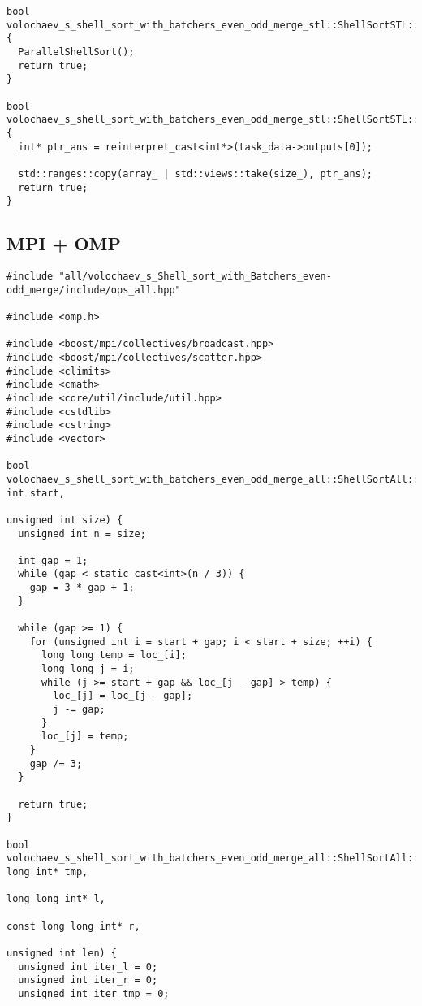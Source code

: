 \documentclass[12pt]{article}
\begin{document}
\begin{lstlisting}
bool volochaev_s_shell_sort_with_batchers_even_odd_merge_stl::ShellSortSTL::RunImpl() {
  ParallelShellSort();
  return true;
}

bool volochaev_s_shell_sort_with_batchers_even_odd_merge_stl::ShellSortSTL::PostProcessingImpl() {
  int* ptr_ans = reinterpret_cast<int*>(task_data->outputs[0]);

  std::ranges::copy(array_ | std::views::take(size_), ptr_ans);
  return true;
}
\end{lstlisting}

\subsection*{MPI + OMP}
\begin{lstlisting}
#include "all/volochaev_s_Shell_sort_with_Batchers_even-odd_merge/include/ops_all.hpp"

#include <omp.h>

#include <boost/mpi/collectives/broadcast.hpp>
#include <boost/mpi/collectives/scatter.hpp>
#include <climits>
#include <cmath>
#include <core/util/include/util.hpp>
#include <cstdlib>
#include <cstring>
#include <vector>

bool volochaev_s_shell_sort_with_batchers_even_odd_merge_all::ShellSortAll::ShellSort(unsigned int start,
                                                                                      unsigned int size) {
  unsigned int n = size;

  int gap = 1;
  while (gap < static_cast<int>(n / 3)) {
    gap = 3 * gap + 1;
  }

  while (gap >= 1) {
    for (unsigned int i = start + gap; i < start + size; ++i) {
      long long temp = loc_[i];
      long long j = i;
      while (j >= start + gap && loc_[j - gap] > temp) {
        loc_[j] = loc_[j - gap];
        j -= gap;
      }
      loc_[j] = temp;
    }
    gap /= 3;
  }

  return true;
}

bool volochaev_s_shell_sort_with_batchers_even_odd_merge_all::ShellSortAll::OddEvenMergeOMP(long long int* tmp,
                                                                                            long long int* l,
                                                                                            const long long int* r,
                                                                                            unsigned int len) {
  unsigned int iter_l = 0;
  unsigned int iter_r = 0;
  unsigned int iter_tmp = 0;


\end{lstlisting}
\end{document}
